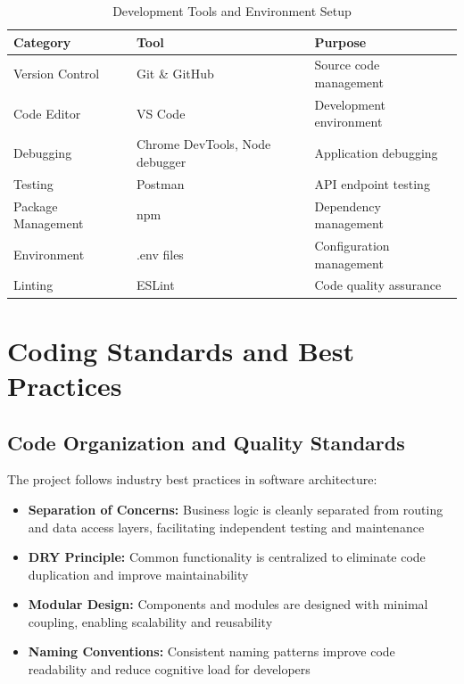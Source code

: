 \documentclass[12pt,a4paper]{report}
\newcommand{\rA}{\rowcolor{white}}
\newcommand{\rB}{\rowcolor{lightgray}}
\newcommand{\rH}{\rowcolor{headcol}}
\begin{document}
\begin{table}[H]
  \centering
  \small
  \begin{tabular}{|l|l|l|}
    \hline
    \rH \textbf{Category} & \textbf{Tool} & \textbf{Purpose} \\
    \hline
    \rA Version Control & Git \& GitHub & Source code management \\
    \hline
    \rB Code Editor & VS Code & Development environment \\
    \hline
    \rA Debugging & Chrome DevTools, Node debugger & Application debugging \\
    \hline
    \rB Testing & Postman & API endpoint testing \\
    \hline
    \rA Package Management & npm & Dependency management \\
    \hline
    \rB Environment & .env files & Configuration management \\
    \hline
    \rA Linting & ESLint & Code quality assurance \\
    \hline
  \end{tabular}
  \caption{Development Tools and Environment Setup}
  \label{tab:dev_tools}
\end{table}

\section{Coding Standards and Best Practices}

\subsection{Code Organization and Quality Standards}

The project follows industry best practices in software architecture:

\begin{itemize}[left=0pt]
  \item \textbf{Separation of Concerns:} Business logic is cleanly separated from routing and data access layers, facilitating independent testing and maintenance
  \item \textbf{DRY Principle:} Common functionality is centralized to eliminate code duplication and improve maintainability
  \item \textbf{Modular Design:} Components and modules are designed with minimal coupling, enabling scalability and reusability
  \item \textbf{Naming Conventions:} Consistent naming patterns improve code readability and reduce cognitive load for developers
\end{itemize}
\end{document}
